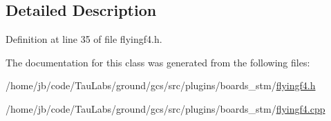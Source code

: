 \subsection{\-Detailed \-Description}


\-Definition at line 35 of file flyingf4.\-h.



\-The documentation for this class was generated from the following files\-:\begin{DoxyCompactItemize}
\item 
/home/jb/code/\-Tau\-Labs/ground/gcs/src/plugins/boards\-\_\-stm/\hyperlink{flyingf4_8h}{flyingf4.\-h}\item 
/home/jb/code/\-Tau\-Labs/ground/gcs/src/plugins/boards\-\_\-stm/\hyperlink{flyingf4_8cpp}{flyingf4.\-cpp}\end{DoxyCompactItemize}
